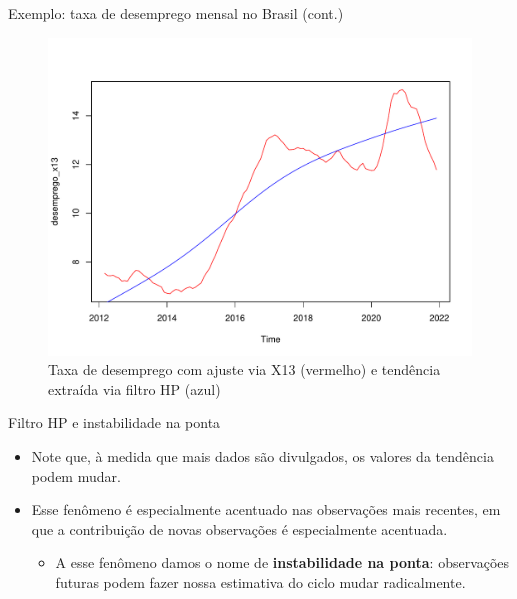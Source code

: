 \documentclass[11pt]{beamer}
\begin{document}
\begin{frame}{Exemplo: taxa de desemprego mensal no Brasil (cont.)}
	\begin{figure}
		\caption{Taxa de desemprego com ajuste via X13 (vermelho) e tendência extraída via filtro HP (azul)}
		\includegraphics[scale=0.4]{graficos/desemprego_hp.pdf}
	\end{figure}
\end{frame}


\begin{frame}{Filtro HP e instabilidade na ponta}
	\begin{itemize}
		\item Note que, à medida que mais dados são divulgados, os valores da tendência podem mudar.
		\item Esse fenômeno é especialmente acentuado nas observações mais recentes, em que a contribuição de novas observações é especialmente acentuada.
		\begin{itemize}
			\item A esse fenômeno damos o nome de \textbf{instabilidade na ponta}: observações futuras podem fazer nossa estimativa do ciclo mudar radicalmente.
		\end{itemize} 
	\end{itemize}
\end{frame}
\end{document}
